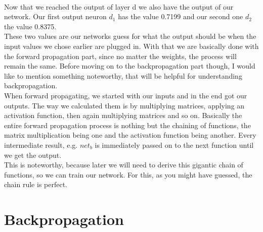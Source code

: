\documentclass[11pt, halfparskip]{article}
\begin{document}
        \noindent \\
        Now that we reached the output of layer d we also have the output of our network. Our first output neuron $d_1$ has the value 0.7199 and our second one $d_2$ the 
        value 0.8375.\\
        These two values are our networks guess for what the output should be when the input values we chose earlier are plugged in. With that we are basically done with the forward
        propagation part, since no matter the weights, the process will remain the same. Before moving on to the backpropagation part though, I would like to mention something
        noteworthy, that will be helpful for understanding backpropagation.\\
        When forward propagating, we started with our inputs and in the end got our outputs. The way we calculated them is by multiplying matrices, applying an activation function, then
        again multiplying matrices and so on. Basically the entire forward propagation process is nothing but the chaining of functions, the matrix multiplication being one and the
        activation function being another. Every intermediate result, e.g. $net_b$ is immediately passed on to the next function until we get the output.\\
        This is noteworthy, because later we will need to derive this gigantic chain of functions, so we can train our network. For this, as you might have guessed, the chain rule is perfect.
        
        
     \section{Backpropagation}
     \label{sec:backpropagation}
\end{document}
